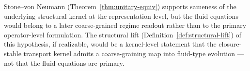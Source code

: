 \begin{remark}
Stone--von Neumann (Theorem~\ref{thm:unitary-equiv}) supports sameness
of the underlying structural kernel at the representation level, but the
fluid equations would belong to a later coarse-grained regime readout
rather than to the primary operator-level formulation. The structural
lift (Definition~\ref{def:structural-lift}) of this hypothesis, if
realizable, would be a kernel-level statement that the closure-stable
transport kernel admits a coarse-graining map into fluid-type evolution
--- not that the fluid equations are primary.
\end{remark}



